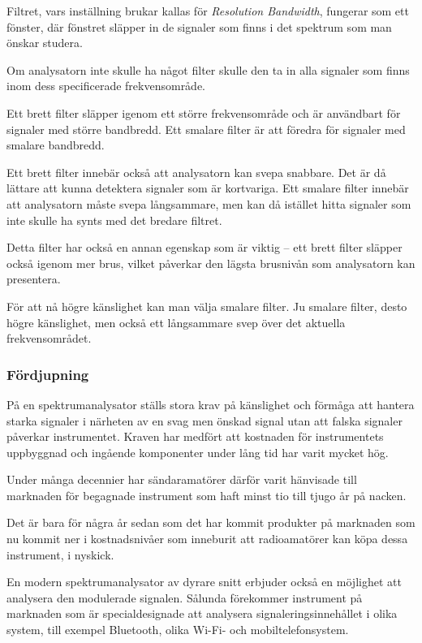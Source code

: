Filtret, vars inställning brukar kallas för \emph{Resolution Bandwidth},
fungerar som ett fönster, där fönstret släpper in de signaler som finns i det
spektrum som man önskar studera.

Om analysatorn inte skulle ha något filter skulle den ta in alla signaler som
finns inom dess specificerade frekvensområde.

Ett brett filter släpper igenom ett större frekvensområde och är användbart för
signaler med större bandbredd.
Ett smalare filter är att föredra för signaler med smalare bandbredd.

Ett brett filter innebär också att analysatorn kan svepa snabbare.
Det är då lättare att kunna detektera signaler som är kortvariga.
Ett smalare filter innebär att analysatorn måste svepa långsammare, men kan då
istället hitta signaler som inte skulle ha synts med det bredare filtret.

Detta filter har också en annan egenskap som är viktig -- ett brett filter
släpper också igenom mer brus, vilket påverkar den lägsta brusnivån som
analysatorn kan presentera.

För att nå högre känslighet kan man välja smalare filter.
Ju smalare filter, desto högre känslighet, men också ett långsammare svep över
det aktuella frekvensområdet.

\subsubsection{Fördjupning}

På en spektrumanalysator ställs stora krav på känslighet och förmåga att hantera
starka signaler i närheten av en svag men önskad signal utan att falska signaler
påverkar instrumentet.
Kraven har medfört att kostnaden för instrumentets uppbyggnad och ingående
komponenter under lång tid har varit mycket hög.

Under många decennier har sändaramatörer därför varit hänvisade till
marknaden för begagnade instrument som haft minst tio till tjugo år på nacken.

Det är bara för några år sedan som det har kommit produkter på marknaden som nu
kommit ner i kostnadsnivåer som inneburit att radioamatörer kan köpa dessa
instrument, i nyskick.

En modern spektrumanalysator av dyrare snitt erbjuder också en möjlighet att
analysera den modulerade signalen.
Sålunda förekommer instrument på marknaden som är specialdesignade att
analysera signaleringsinnehållet i olika system, till exempel Bluetooth, olika
Wi-Fi- och mobiltelefonsystem.

